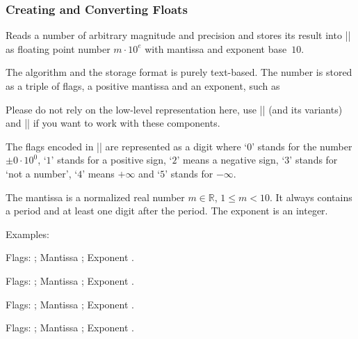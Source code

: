 \subsubsection{Creating and Converting Floats}
\begin{command}{\pgfmathfloatparsenumber{}}
  Reads a number of arbitrary magnitude and precision and stores its
  result into |\pgfmathresult| as floating point number $m \cdot 10^e$
  with mantissa and exponent base~$10$. 

  The algorithm and the storage format is purely text-based. The
  number is stored as a triple of flags, a positive mantissa and an
  exponent, such as 
\begin{codeexample}[]
\pgfmathresult
\end{codeexample}
  Please do not rely on the low-level representation here, use
  |\pgfmathfloattomacro| (and its variants) and |\pgfmathfloatcreate|
  if you want to work with these components. 

  The flags encoded in |\pgfmathresult| are represented as a digit
  where `$0$' stands for the number $\pm 0\cdot 10^0$, `$1$' stands
  for a positive sign, `$2$' means a negative sign, `$3$' stands for
  `not a number', `$4$' means $+\infty$ and `$5$' stands for
  $-\infty$. 

  The mantissa is a normalized real number $m \in \mathbb{R}$, $1 \le
  m < 10$. It always contains a period and at least one digit after
  the period. The exponent is an integer. 

  Examples:
\begin{codeexample}[]
\pgfmathfloattomacro{\pgfmathresult}{\F}{\M}{\E}
Flags: \F; Mantissa \M; Exponent \E.
\end{codeexample}

\begin{codeexample}[]
\pgfmathfloattomacro{\pgfmathresult}{\F}{\M}{\E}
Flags: \F; Mantissa \M; Exponent \E.
\end{codeexample}

\begin{codeexample}[]
\pgfmathfloattomacro{\pgfmathresult}{\F}{\M}{\E}
Flags: \F; Mantissa \M; Exponent \E.
\end{codeexample}

\begin{codeexample}[]
\pgfmathfloattomacro{\pgfmathresult}{\F}{\M}{\E}
Flags: \F; Mantissa \M; Exponent \E.
\end{codeexample}


\end{command}
